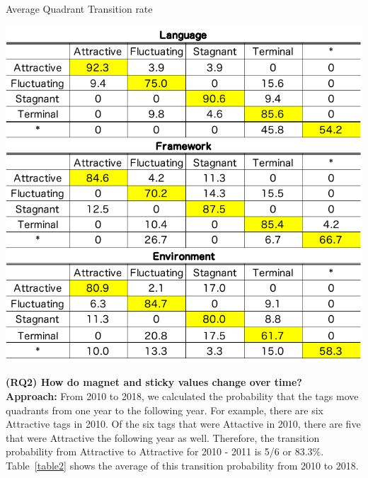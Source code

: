 \documentclass[conference]{IEEEtran}
\begin{document}
\begin{table}[t]
 \centering
 \caption{Average Quadrant Transition rate}
 \includegraphics[width=1.0\hsize]{img/averageAFST.pdf} 
 \label{table2} 
\end{table}

\textbf{(RQ2) How do magnet and sticky values change over time?} \\
\smallskip
\textbf{Approach:}
From 2010 to 2018, we calculated the probability that the tags move quadrants from one year to the following year. For example, there are six Attractive tags in 2010. Of the six tags that were Attactive in 2010, there are five that were Attractive the following year as well. Therefore, the transition probability from Attractive to Attractive for 2010 - 2011 is 5/6 or 83.3\%. Table~\ref{table2} shows the average of this transition probability from 2010 to 2018.
\end{document}
